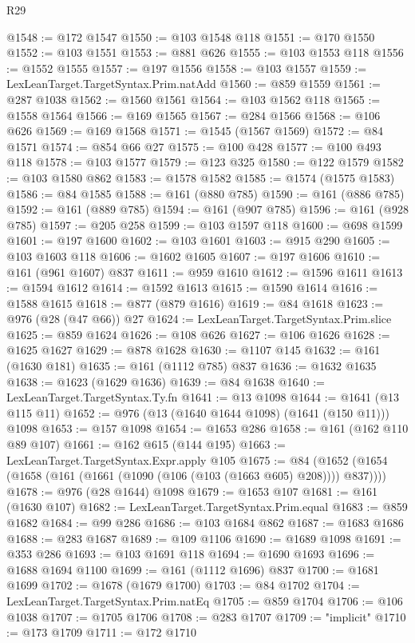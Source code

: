 \begin{lexlean}{R29}
\begin{coremodule}
@1548 := @172 @1547
@1550 := @103 @1548 @118
@1551 := @170 @1550
@1552 := @103 @1551
@1553 := @881 @626
@1555 := @103 @1553 @118
@1556 := @1552 @1555
@1557 := @197 @1556
@1558 := @103 @1557
@1559 := LexLeanTarget.TargetSyntax.Prim.natAdd
@1560 := @859 @1559
@1561 := @287 @1038
@1562 := @1560 @1561
@1564 := @103 @1562 @118
@1565 := @1558 @1564
@1566 := @169 @1565
@1567 := @284 @1566
@1568 := @106 @626
@1569 := @169 @1568
@1571 := @1545 (@1567 @1569)
@1572 := @84 @1571
@1574 := @854 @66 @27
@1575 := @100 @428
@1577 := @100 @493 @118
@1578 := @103 @1577
@1579 := @123 @325
@1580 := @122 @1579
@1582 := @103 @1580 @862
@1583 := @1578 @1582
@1585 := @1574 (@1575 @1583)
@1586 := @84 @1585
@1588 := @161 (@880 @785)
@1590 := @161 (@886 @785)
@1592 := @161 (@889 @785)
@1594 := @161 (@907 @785)
@1596 := @161 (@928 @785)
@1597 := @205 @258
@1599 := @103 @1597 @118
@1600 := @698 @1599
@1601 := @197 @1600
@1602 := @103 @1601
@1603 := @915 @290
@1605 := @103 @1603 @118
@1606 := @1602 @1605
@1607 := @197 @1606
@1610 := @161 (@961 @1607) @837
@1611 := @959 @1610
@1612 := @1596 @1611
@1613 := @1594 @1612
@1614 := @1592 @1613
@1615 := @1590 @1614
@1616 := @1588 @1615
@1618 := @877 (@879 @1616)
@1619 := @84 @1618
@1623 := @976 (@28 (@47 @66)) @27
@1624 := LexLeanTarget.TargetSyntax.Prim.slice
@1625 := @859 @1624
@1626 := @108 @626
@1627 := @106 @1626
@1628 := @1625 @1627
@1629 := @878 @1628
@1630 := @1107 @145
@1632 := @161 (@1630 @181)
@1635 := @161 (@1112 @785) @837
@1636 := @1632 @1635
@1638 := @1623 (@1629 @1636)
@1639 := @84 @1638
@1640 := LexLeanTarget.TargetSyntax.Ty.fn
@1641 := @13 @1098
@1644 := @1641 (@13 @115 @11)
@1652 := @976 (@13 (@1640 @1644 @1098) (@1641 (@150 @11))) @1098
@1653 := @157 @1098
@1654 := @1653 @286
@1658 := @161 (@162 @110 @89 @107)
@1661 := @162 @615 (@144 @195)
@1663 := LexLeanTarget.TargetSyntax.Expr.apply @105
@1675 := @84 (@1652 (@1654 (@1658 (@161 (@1661 (@1090 (@106 (@103 (@1663 @605) @208)))) @837))))
@1678 := @976 (@28 @1644) @1098
@1679 := @1653 @107
@1681 := @161 (@1630 @107)
@1682 := LexLeanTarget.TargetSyntax.Prim.equal
@1683 := @859 @1682
@1684 := @99 @286
@1686 := @103 @1684 @862
@1687 := @1683 @1686
@1688 := @283 @1687
@1689 := @109 @1106
@1690 := @1689 @1098
@1691 := @353 @286
@1693 := @103 @1691 @118
@1694 := @1690 @1693
@1696 := @1688 @1694 @1100
@1699 := @161 (@1112 @1696) @837
@1700 := @1681 @1699
@1702 := @1678 (@1679 @1700)
@1703 := @84 @1702
@1704 := LexLeanTarget.TargetSyntax.Prim.natEq
@1705 := @859 @1704
@1706 := @106 @1038
@1707 := @1705 @1706
@1708 := @283 @1707
@1709 := "implicit"
@1710 := @173 @1709
@1711 := @172 @1710

\end{coremodule}
\end{lexlean}
